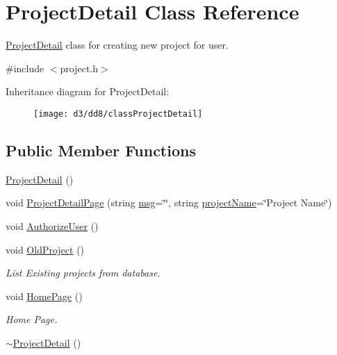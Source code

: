 \hypertarget{classProjectDetail}{\section{\-Project\-Detail \-Class \-Reference}
\label{d3/dd8/classProjectDetail}
}


\hyperlink{classProjectDetail}{\-Project\-Detail} class for creating new project for user.  




{\ttfamily \#include $<$project.\-h$>$}

\-Inheritance diagram for \-Project\-Detail\-:\begin{figure}[H]
\begin{center}
\leavevmode
\texttt{[image: d3/dd8/classProjectDetail]}
\end{center}
\end{figure}
\subsection*{\-Public \-Member \-Functions}
\begin{DoxyCompactItemize}
\item 
\hyperlink{classProjectDetail_a405e8bbc157e30c4ff93871988218d9f}{\-Project\-Detail} ()
\item 
void \hyperlink{classProjectDetail_a581ccdab5dcd21663b78ebedbbf0d240}{\-Project\-Detail\-Page} (string \hyperlink{classInputDetail_a1abb16cd695678c3fa05e3c812823fee}{msg}=\char`\"{}\char`\"{}, string \hyperlink{classInputDetail_aaaf51475a2a4ddbe34e38c96bdb45bad}{project\-Name}=\char`\"{}\-Project \-Name\char`\"{})
\item 
void \hyperlink{classProjectDetail_ab78c9e2a0cd5079c427638a5a3971c28}{\-Authorize\-User} ()
\item 
void \hyperlink{classProjectDetail_ab92c992a37524a5f90fdcaf4868ac218}{\-Old\-Project} ()
\begin{DoxyCompactList}\small\item\em \-List \-Existing projects from database. \end{DoxyCompactList}\item 
void \hyperlink{classProjectDetail_aa36fe7134da17688018870ae8ebf2191}{\-Home\-Page} ()
\begin{DoxyCompactList}\small\item\em \-Home \-Page. \end{DoxyCompactList}\item 
\hyperlink{classProjectDetail_ab4719d14d9efb8811916f5d691099c8f}{$\sim$\-Project\-Detail} ()
\end{DoxyCompactItemize}


